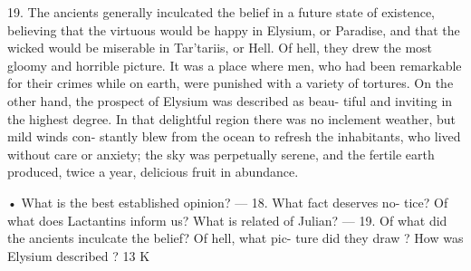 \documentclass[openany,a4paper]{memoir}
\begin{document}
19. The ancients generally inculcated the belief in a future 
state of existence, believing that the virtuous would be happy 
in Elysium, or Paradise, and that the wicked would be 
miserable in Tar'tariis, or Hell. Of hell, they drew the 
most gloomy and horrible picture. It was a place where 
men, who had been remarkable for their crimes while on 
earth, were punished with a variety of tortures. On the 
other hand, the prospect of Elysium was described as beau- 
tiful and inviting in the highest degree. In that delightful 
region there was no inclement weather, but mild winds con- 
stantly blew from the ocean to refresh the inhabitants, who 
lived without care or anxiety; the sky was perpetually serene, 
and the fertile earth produced, twice a year, delicious fruit 
in abundance. 

• 
What is the best established opinion? — 18. What fact deserves no- 
tice? Of what does Lactantins inform us? What is related of Julian? 
— 19. Of what did the ancients inculcate the belief? Of hell, what pic- 
ture did they draw ? How was Elysium described ? 
13 K 
\end{document}
